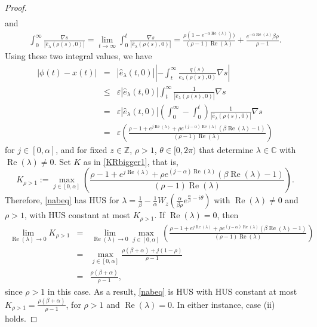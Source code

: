 \documentclass[10pt,a4paper]{amsart}
\newcommand{\C}{\ensuremath{\mathbb{C}}}
\newcommand{\Z}{\ensuremath{\mathbb{Z}}}
\begin{document}
\begin{proof}
\begin{eqnarray}
\end{eqnarray}
and 
\begin{eqnarray*}
 \int_{0}^{\infty} \frac{\nabla s}{|\widehat{e}_{\lambda}(\rho(s),0)|} 
  = \lim_{t\rightarrow\infty}\int_{0}^{t} \frac{\nabla s}{|\widehat{e}_{\lambda}(\rho(s),0)|} 
	= \frac{\rho(1-e^{-\alpha\operatorname{Re}(\lambda)}))}{(\rho-1)\operatorname{Re}(\lambda)} + \frac{e^{-\alpha\operatorname{Re}(\lambda)}\beta \rho}{\rho-1} .
\end{eqnarray*}
Using these two integral values, we have
\begin{eqnarray*} 
 |\phi(t)-x(t)| &=& |\widehat{e}_{\lambda}(t,0)| \left|-\int_{t}^{\infty} \frac{q(s)}{\widehat{e}_{\lambda}(\rho(s),0)}\nabla s\right| \\
	&\le& \varepsilon |\widehat{e}_{\lambda}(t,0)| \int_{t}^{\infty} \frac{1}{|\widehat{e}_{\lambda}(\rho(s),0)|}\nabla s \\
	& = & \varepsilon |\widehat{e}_{\lambda}(t,0)| \left(\int_{0}^{\infty}-\int_{0}^{t} \right)\frac{1}{|\widehat{e}_{\lambda}(\rho(s),0)|}\nabla s  \\
	& = & \varepsilon \left(\frac{\rho-1+e^{j\operatorname{Re}(\lambda)}+\rho e^{(j-\alpha)\operatorname{Re}(\lambda)}\left(\beta\operatorname{Re}(\lambda)-1\right)}{(\rho-1)\operatorname{Re}(\lambda)}\right)
\end{eqnarray*}
for $j\in[0,\alpha]$, and for fixed $z\in\Z$, $\rho>1$, $\theta\in[0,2\pi)$ that determine $\lambda\in\C$ with $\operatorname{Re}(\lambda)\ne 0$. Set 
$K$ as in \eqref{KRbigger1}, that is,
$$ K_{\rho>1}:=\max_{j\in[0,\alpha]}\left(\frac{\rho-1+e^{j\operatorname{Re}(\lambda)}+\rho e^{(j-\alpha)\operatorname{Re}(\lambda)}\left(\beta\operatorname{Re}(\lambda)-1\right)}{(\rho-1)\operatorname{Re}(\lambda)}\right). $$
Therefore, \eqref{nabeq} has HUS for $\lambda = \frac{1}{\beta}-\frac{1}{\alpha}W_z\left(\frac{\alpha}{\beta \rho}e^{\frac{\alpha}{\beta}-i\theta}\right)$ with $\operatorname{Re}(\lambda)\ne 0$ and $\rho>1$, with HUS constant at most $K_{\rho>1}$. If $\operatorname{Re}(\lambda)=0$, then
\begin{eqnarray*} 
 \lim_{\operatorname{Re}(\lambda)\rightarrow 0} K_{\rho>1} &=& \lim_{\operatorname{Re}(\lambda)\rightarrow 0}\max_{j\in[0,\alpha]}\left(\frac{\rho-1+e^{j\operatorname{Re}(\lambda)}+\rho e^{(j-\alpha)\operatorname{Re}(\lambda)}\left(\beta\operatorname{Re}(\lambda)-1\right)}{(\rho-1)\operatorname{Re}(\lambda)}\right) \\
  &=& \max_{j\in[0,\alpha]}\frac{\rho(\beta+\alpha)+j(1-\rho)}{\rho-1} \\
	&=& \frac{\rho(\beta+\alpha)}{\rho-1},
\end{eqnarray*}
since $\rho>1$ in this case. As a result, \eqref{nabeq} is HUS with HUS constant at most $K_{\rho>1}=\frac{\rho(\beta+\alpha)}{\rho-1}$, for $\rho>1$ and $\operatorname{Re}(\lambda)=0$. In either instance, case (ii) holds.


\end{proof}
\end{document}
